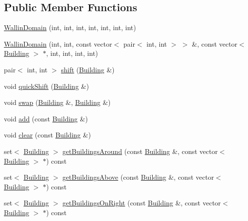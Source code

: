 \subsection*{Public Member Functions}
\begin{DoxyCompactItemize}
\item 
\hyperlink{classghost_1_1WallinDomain_ae1ddf3018a8a2ea05640fa205c7648ae}{Wallin\-Domain} (int, int, int, int, int, int, int)
\item 
\hyperlink{classghost_1_1WallinDomain_a7046cedfab0ef5de127c1e707fd66c10}{Wallin\-Domain} (int, int, const vector$<$ pair$<$ int, int $>$ $>$ \&, const vector$<$ \hyperlink{classghost_1_1Building}{Building} $>$ $\ast$, int, int, int, int)
\item 
pair$<$ int, int $>$ \hyperlink{classghost_1_1WallinDomain_a00889726b2f7ae7f87070e35c07c1d37}{shift} (\hyperlink{classghost_1_1Building}{Building} \&)
\item 
void \hyperlink{classghost_1_1WallinDomain_a6d5d714504bf33eed03c8bbc9f929b5e}{quick\-Shift} (\hyperlink{classghost_1_1Building}{Building} \&)
\item 
void \hyperlink{classghost_1_1WallinDomain_a197909e511e4fd49d9710ccf121af486}{swap} (\hyperlink{classghost_1_1Building}{Building} \&, \hyperlink{classghost_1_1Building}{Building} \&)
\item 
void \hyperlink{classghost_1_1WallinDomain_a53d34fe16c41d5d98ce212fe6145de5d}{add} (const \hyperlink{classghost_1_1Building}{Building} \&)
\item 
void \hyperlink{classghost_1_1WallinDomain_a410af68bdfdd6d15e3c4266b049c20cd}{clear} (const \hyperlink{classghost_1_1Building}{Building} \&)
\item 
set$<$ \hyperlink{classghost_1_1Building}{Building} $>$ \hyperlink{classghost_1_1WallinDomain_a3e3381fcb60d5a2a89f5d145af447c31}{get\-Buildings\-Around} (const \hyperlink{classghost_1_1Building}{Building} \&, const vector$<$ \hyperlink{classghost_1_1Building}{Building} $>$ $\ast$) const 
\item 
set$<$ \hyperlink{classghost_1_1Building}{Building} $>$ \hyperlink{classghost_1_1WallinDomain_acde7d4ffbc355dc8831c412b449fae93}{get\-Buildings\-Above} (const \hyperlink{classghost_1_1Building}{Building} \&, const vector$<$ \hyperlink{classghost_1_1Building}{Building} $>$ $\ast$) const 
\item 
set$<$ \hyperlink{classghost_1_1Building}{Building} $>$ \hyperlink{classghost_1_1WallinDomain_ae8b773686f735a863c2743469a3dc741}{get\-Buildings\-On\-Right} (const \hyperlink{classghost_1_1Building}{Building} \&, const vector$<$ \hyperlink{classghost_1_1Building}{Building} $>$ $\ast$) const 

\end{DoxyCompactItemize}
